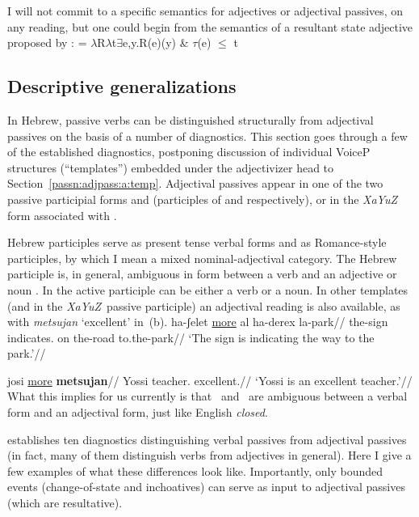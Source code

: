 I will not commit to a specific semantics for adjectives or adjectival passives, on any reading, but one could begin from the semantics of a resultant state adjective proposed by \cite{kratzer00bls}:
\ex {} = $\lambda$R$\lambda$t$\exists$e,y.R(e)(y) \& $\tau$(e) $\le$ t
\xe

	\subsection{Descriptive generalizations} \label{passn:adjpass:mpua}
In Hebrew, passive verbs can be distinguished structurally from adjectival passives on the basis of a number of diagnostics. This section goes through a few of the established diagnostics, postponing discussion of individual VoiceP structures (``templates'') embedded under the adjectivizer head to Section~\ref{passn:adjpass:a:temp}. Adjectival passives appear in one of the two passive participial forms {\mpua} and {\mhuf} (participles of {\tpua} and {\thuf} respectively), or in the \emph{XaYuZ} form associated with \tkal.

Hebrew participles serve as present tense verbal forms and as Romance-style participles, by which I mean a mixed nominal-adjectival category. The Hebrew participle is, in general, ambiguous in form between a verb and an adjective or noun \citep{boneh13tense,doron13ehll}. In {\tkal} the active participle can be either a verb or a noun. In other templates (and in the \emph{XaYuZ}~passive participle) an adjectival reading is also available, as with \emph{metsujan} `excellent' in~(\nextx b).
\pex
	\a \begingl
		\gla ha-ʃelet \underline{more} al ha-derex la-park//
		\glb the-sign indicates. on the-road to.the-park//
		\glft `The sign is indicating the way to the park.'//
	\endgl
	
	\a \begingl
		\gla josi \underline{more} \textbf{metsujan}//
		\glb Yossi teacher. excellent.//
		\glft `Yossi is an excellent teacher.'//
	\endgl
\xe
What this implies for us currently is that \mpua~and \mhuf~are ambiguous between a verbal form and an adjectival form, just like English \emph{closed}.

\cite{doron00} establishes ten diagnostics distinguishing verbal passives from adjectival passives (in fact, many of them distinguish verbs from adjectives in general). Here I give a few examples of what these differences look like. Importantly, only bounded events (change-of-state and inchoatives) can serve as input to adjectival passives (which are resultative).

